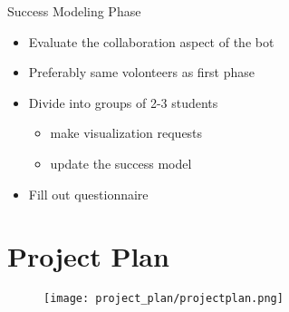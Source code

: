 \begin{frame}{Success Modeling Phase}
  \begin{itemize}
    \item Evaluate the collaboration aspect of the bot
    \item Preferably same volonteers as first phase %
    \item Divide into groups of 2-3 students
          \begin{itemize}
            \item make visualization requests
            \item update the success model
          \end{itemize}
    \item Fill out questionnaire
  \end{itemize}
\end{frame}

\section{Project Plan}

\begin{frame}
  \begin{figure}
    \centering
    \texttt{[image: project\_plan/projectplan.png]}

    \label{fig:visualReq}
  \end{figure}
\end{frame}